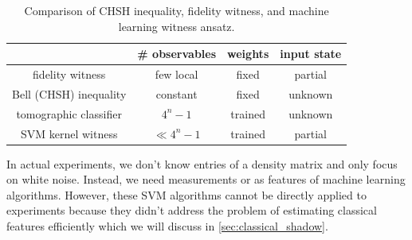 \documentclass[
reprint,
aps,
pra,
floatfix,
]{revtex4-2}
\theoremstyle{plain}
\theoremstyle{definition}
\begin{document}
\begin{table}[!ht]
	\centering
	\begin{tabular}{c|c|c|c}
		& \# observables & weights & input state \\
		\hline
		fidelity  witness & few local & fixed & partial  \\  
		Bell (CHSH) inequality & constant & fixed & unknown \\  
		tomographic classifier & $4^n-1$ & trained & unknown \\  
		SVM kernel witness &  $\ll 4^n-1$ & trained & partial \\  
		\hline
	\end{tabular}
	\caption{Comparison of CHSH inequality, fidelity witness, and machine learning witness ansatz.}
\end{table}

In actual experiments, we don't know entries of a density matrix and only focus on white noise.
Instead, we need measurements or  as features of machine learning algorithms.
However, these SVM algorithms cannot be directly applied to experiments because they didn't address the problem of estimating classical features efficiently which we will discuss in \cref{sec:classical_shadow}.


\end{document}

